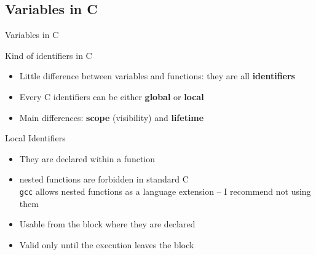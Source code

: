 \subsection{Variables in C}
\begin{Coupe}
\begin{frame}{Variables in C}
  \begin{block}{Kind of identifiers in C}
    \begin{itemize}
    \item Little difference between variables and functions: they are all
      \textbf{\alert{identifiers}}
    \item Every C identifiers can be either \textbf{\alert{global}} or \textbf{\alert{local}}
    \item Main differences: \textbf{\alert{scope}}
      (visibility) and \textbf{\alert{lifetime}}
    \end{itemize}
  \end{block}\vspace{-.5\baselineskip}

  \begin{block}{Local Identifiers}
    \begin{itemize}
    \item They are declared within a function
    \item {} nested functions are forbidden in standard C\\
      {\small \texttt{gcc} allows nested functions as a language extension -- I
        recommend not using them}
    \item {} Usable from the block where they are declared
    \item {} Valid only until the execution leaves
      the block
    \end{itemize}
  \end{block}\vspace{-.5\baselineskip}


\end{frame}
\end{Coupe}
